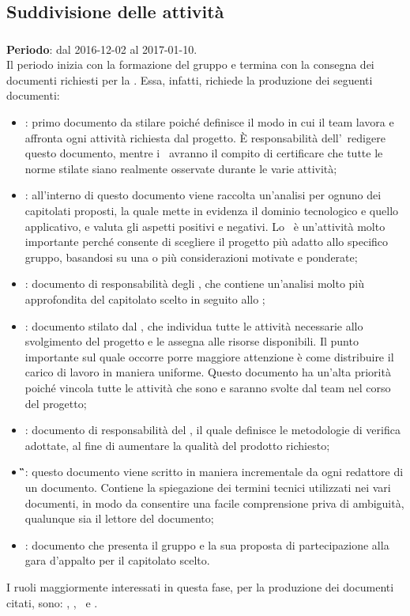 	\subsection{Suddivisione delle attività}
		\subsubsection{\AR}
		\textbf{Periodo}: dal 2016-12-02 al 2017-01-10.\\
		Il periodo inizia con la formazione del gruppo e termina con la consegna dei documenti richiesti per la \RR. Essa, infatti, richiede la produzione dei seguenti documenti:
		\begin{itemize}
			\item \textbf{\NdP}: primo documento da stilare poiché definisce il modo in cui il team lavora e affronta ogni attività richiesta dal progetto. \MakeUppercase{è} responsabilità dell’\Amm\ redigere questo documento, mentre i \Vers\ avranno il compito di certificare che tutte le norme stilate siano realmente osservate durante le varie attività;
			\item \textbf{\SdF}: all'interno di questo documento viene raccolta un'analisi per ognuno dei capitolati proposti, la quale mette in evidenza il dominio tecnologico e quello applicativo, e valuta gli aspetti positivi e negativi. Lo \SdF\ è un’attività molto importante perché consente di scegliere il progetto più adatto allo specifico gruppo, basandosi su una o più considerazioni motivate e ponderate;
			\item \textbf{\AdR}: documento di responsabilità degli \Anas, che contiene un’analisi molto più approfondita del capitolato scelto in seguito allo \SdF;
			\item \textbf{\PdP}: documento stilato dal \RdP, che individua tutte le attività necessarie allo svolgimento del progetto e le assegna alle risorse disponibili. Il punto importante sul quale occorre porre maggiore attenzione è come distribuire il carico di lavoro in maniera uniforme. Questo documento ha un'alta priorità poiché vincola tutte le attività che sono e saranno svolte dal team nel corso del progetto;
			\item \textbf{\PdQ}: documento di responsabilità del \Ver, il quale definisce le metodologie di verifica adottate, al fine di aumentare la qualità del prodotto richiesto;
			\item \textbf{\G}: questo documento viene scritto in maniera incrementale da ogni redattore di un documento. Contiene la spiegazione dei termini tecnici utilizzati nei vari documenti, in modo da consentire una facile comprensione priva di ambiguità, qualunque sia il lettore del documento;
			\item \textbf{\LdP}: documento che presenta il gruppo e la sua proposta di partecipazione alla gara d’appalto per il capitolato scelto.
		\end{itemize}
		I ruoli maggiormente interessati in questa fase, per la produzione dei documenti citati, sono: \Amm, \Res, \Ana\ e \Ver.
		
